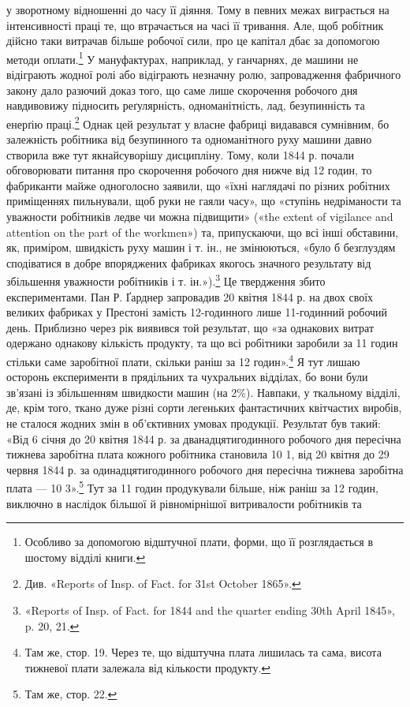 \parcont{}  %
у зворотному відношенні до часу її діяння. Тому в певних межах
виграється на інтенсивності праці те, що втрачається на часі її
тривання. Але, щоб робітник дійсно таки витрачав більше робочої
сили, про це капітал дбає за допомогою методи оплати.\footnote{
Особливо за допомогою відштучної плати, форми, що її розглядається
в шостому відділі книги.
} У мануфактурах,
наприклад, у ганчарнях, де машини не відіграють
жодної ролі або відіграють незначну ролю, запровадження фабричного
закону дало разючий доказ того, що саме лише скорочення
робочого дня навдивовижу підносить реґулярність, одноманітність,
лад, безупинність та енерґію праці.\footnote{
Див. «Reports of Insp. of Fact. for 31st October 1865».
} Однак цей результат
у власне фабриці видавався сумнівним, бо залежність робітника
від безупинного та одноманітного руху машини давно створила
вже тут якнайсуворішу дисципліну. Тому, коли 1844 р.
почали обговорювати питання про скорочення робочого дня
нижче від 12 годин, то фабриканти майже одноголосно заявили,
що «їхні наглядачі по різних робітних приміщеннях пильнували,
щоб руки не гаяли часу», що «ступінь недріманости та уважности
робітників ледве чи можна підвищити» («the extent of vigilance
and attention on the part of the workmen») та, припускаючи, що всі
інші обставини, як, приміром, швидкість руху машин і т. ін.,
не змінюються, «було б безглуздям сподіватися в добре впоряджених
фабриках якогось значного результату від збільшення
уважности робітників і т. ін.»).\footnote{
«Reports of Insp. of Fact. for 1844 and the quarter ending 30th
April 1845», p. 20, 21.
} Це твердження збито експериментами.
Пан Р. Ґарднер запровадив 20 квітня 1844 р. на двох
своїх великих фабриках у Престоні замість 12-годинного лише
11-годинний робочий день. Приблизно через рік виявився
той результат, що «за однакових витрат одержано однакову
кількість продукту, та що всі робітники заробили за 11 годин
стільки саме заробітної плати, скільки раніш за 12 годин».\footnote{
Там же, стор. 19. Через те, що відштучна плата лишилась та
сама, висота тижневої плати залежала від кількости продукту.
}
Я тут лишаю осторонь експерименти в прядільних та чухральних
відділах, бо вони були зв’язані із збільшенням швидкости машин
(на 2\%). Навпаки, у ткальному відділі, де, крім того, ткано
дуже різні сорти легеньких фантастичних квітчастих виробів,
не сталося жодних змін в об’єктивних умовах продукції. Результат
був такий: «Від 6 січня до 20 квітня 1844 р. за дванадцятигодинного
робочого дня пересічна тижнева заробітна плата кожного
робітника становила 10 1, від 20 квітня до
29 червня 1844 р. за одинадцятигодинного робочого дня пересічна
тижнева заробітна плата — 10 3».\footnote{
Там же, стор. 22.
} Тут за
11 годин продукували більше, ніж раніш за 12 годин, виключно
в наслідок більшої й рівномірнішої витривалости робітників та
\parbreak{}  %
